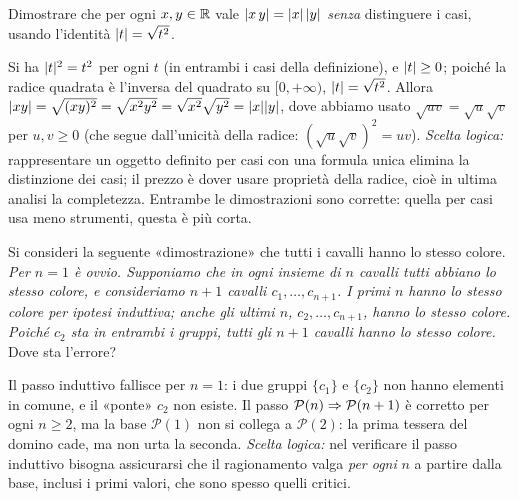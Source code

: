 \begin{esercizio}
Dimostrare che per ogni $x,y\in\mathbb{R}$ vale $\lvert x\,y\rvert=\lvert x\rvert\,\lvert y\rvert$ \emph{senza}
distinguere i casi, usando l'identità $\lvert t\rvert=\sqrt{t^{2}}$.
\begin{soluzione}
Si ha $\lvert t\rvert^{2}=t^{2}$ per ogni $t$ (in entrambi i casi della definizione), e
$\lvert t\rvert\ge0$; poiché la radice quadrata è l'inversa del quadrato su $[0,+\infty)$,
$\lvert t\rvert=\sqrt{t^{2}}$. Allora
$\lvert xy\rvert=\sqrt{(xy)^{2}}=\sqrt{x^{2}y^{2}}=\sqrt{x^{2}}\sqrt{y^{2}}=\lvert x\rvert\lvert y\rvert$,
dove abbiamo usato $\sqrt{uv}=\sqrt u\sqrt v$ per $u,v\ge0$ (che segue dall'unicità
della radice: $(\sqrt u\sqrt v)^{2}=uv$). \emph{Scelta logica:} rappresentare un
oggetto definito per casi con una formula unica elimina la distinzione dei casi; il
prezzo è dover usare proprietà della radice, cioè in ultima analisi la completezza.
Entrambe le dimostrazioni sono corrette: quella per casi usa meno strumenti, questa è
più corta.
\end{soluzione}
\end{esercizio}

\begin{esercizio}
Si consideri la seguente «dimostrazione» che tutti i cavalli hanno lo stesso colore.
\emph{Per $n=1$ è ovvio. Supponiamo che in ogni insieme di $n$ cavalli tutti abbiano lo
stesso colore, e consideriamo $n+1$ cavalli $c_{1},\dots,c_{n+1}$. I primi $n$ hanno lo
stesso colore per ipotesi induttiva; anche gli ultimi $n$, $c_{2},\dots,c_{n+1}$, hanno lo
stesso colore. Poiché $c_{2}$ sta in entrambi i gruppi, tutti gli $n+1$ cavalli hanno lo
stesso colore.} Dove sta l'errore?
\begin{soluzione}
Il passo induttivo fallisce per $n=1$: i due gruppi $\{c_{1}\}$ e $\{c_{2}\}$ non hanno
elementi in comune, e il «ponte» $c_{2}$ non esiste. Il passo $\mathcal{P}(n)\Rightarrow
\mathcal{P}(n+1)$ è corretto per ogni $n\ge2$, ma la base $\mathcal{P}(1)$ non si
collega a $\mathcal{P}(2)$: la prima tessera del domino cade, ma non urta la seconda.
\emph{Scelta logica:} nel verificare il passo induttivo bisogna assicurarsi che il
ragionamento valga \emph{per ogni} $n$ a partire dalla base, inclusi i primi valori,
che sono spesso quelli critici.
\end{soluzione}
\end{esercizio}

